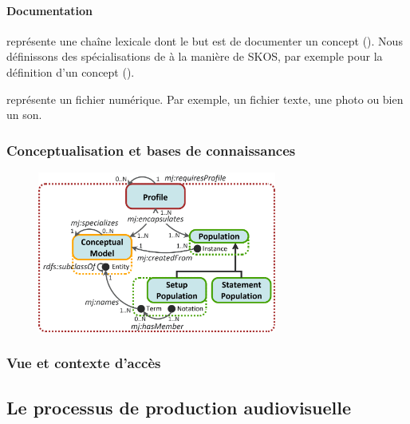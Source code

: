 

\paragraph{Documentation}
	 représente une chaîne lexicale dont le but est de documenter un concept (). 
	Nous définissons des spécialisations de  à la manière de SKOS, par exemple pour la définition d'un concept (). 

 représente un fichier numérique. Par exemple, un fichier texte, une photo ou bien un son. 



\subsubsection{Conceptualisation et bases de connaissances}\label{}
\begin{figure}[ht!]
\centering
\includegraphics[width=0.7\textwidth]{./images/MOD-Profile-v3.png}
\caption{}
\label{img:conceptualisation}
\end{figure}


\subsubsection{Vue et contexte d'accès}\label{}


\subsection{Le processus de production audiovisuelle}\label{}
